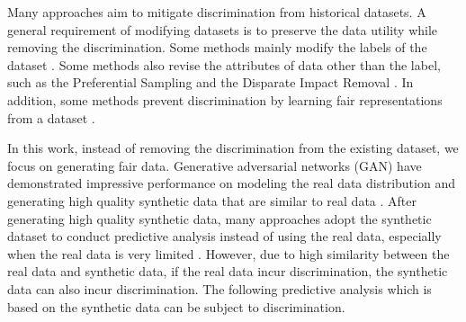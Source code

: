 \documentclass[sigconf]{acmart}
\theoremstyle{definition}
\begin{document}
Many approaches aim to mitigate discrimination from historical datasets. A general requirement of modifying datasets is to preserve the data utility while removing the discrimination. Some methods mainly modify the labels of the dataset \cite{Zhang2017Causal,Kamiran2009Classifying}. Some methods also revise the attributes of data other than the label, such as the Preferential Sampling \cite{Kamiran2012Data} and the Disparate Impact Removal \cite{Feldman2015Certifying}. In addition, some methods prevent discrimination by learning fair representations from a dataset \cite{Edwards2015Censoring,Zemel2013Learning,Louizos2016Variational}.

In this work, instead of removing the discrimination from the existing dataset, we focus on generating fair data.
Generative adversarial networks (GAN) have demonstrated impressive performance on modeling the real data distribution and generating high quality synthetic data that are similar to real data \cite{Goodfellow2014Generative,Radford2015Unsupervised}. After generating high quality synthetic data, many approaches adopt the synthetic dataset to conduct predictive analysis instead of using the real data, especially when the real data is very limited \cite{Choi2017Generating}. However, due to high similarity between the real data and synthetic data, if the real data incur discrimination, the synthetic data can also incur discrimination. The following predictive analysis which is based on the synthetic data can be subject to discrimination. 
\end{document}
